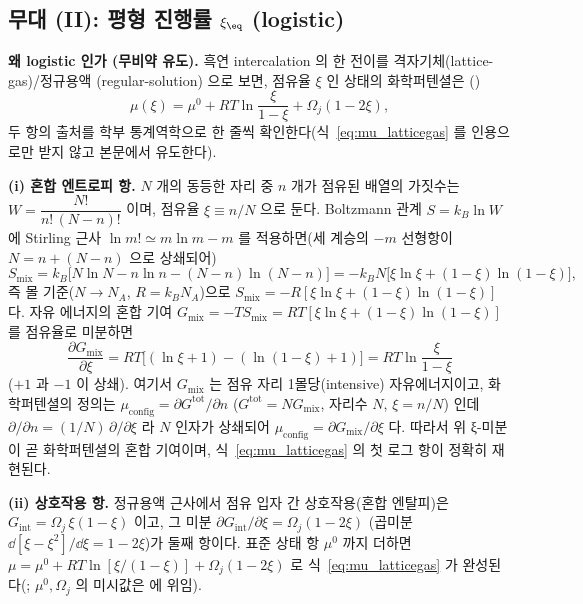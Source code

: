 \subsection{무대 (II): 평형 진행률 $\xi_\eq$ (logistic)}\label{sec:eq}
\textbf{왜 logistic 인가 (무비약 유도).} 흑연 intercalation 의 한 전이를 격자기체(lattice-gas)/정규용액
(regular-solution) 으로 보면, 점유율 $\xi$ 인 상태의 화학퍼텐셜은 \cite{mckinnon1983,bazant2013}()
\begin{equation}
\mu(\xi)=\mu^0+RT\ln\frac{\xi}{1-\xi}+\Omega_j(1-2\xi),
\label{eq:mu_latticegas}
\end{equation}
두 항의 출처를 학부 통계역학으로 한 줄씩 확인한다(식~\eqref{eq:mu_latticegas} 를 인용으로만 받지 않고 본문에서 유도한다).

\textbf{(i) 혼합 엔트로피 항.} $N$ 개의 동등한 자리 중 $n$ 개가 점유된 배열의 가짓수는
$W=\dfrac{N!}{n!\,(N-n)!}$ 이며, 점유율 $\xi\equiv n/N$ 으로 둔다. Boltzmann 관계 $S=k_B\ln W$ 에 Stirling
근사 $\ln m!\simeq m\ln m-m$ 를 적용하면(세 계승의 $-m$ 선형항이 $N=n+(N-n)$ 으로 상쇄되어)
\begin{equation}
S_{\mathrm{mix}}=k_B\big[N\ln N-n\ln n-(N-n)\ln(N-n)\big]
=-k_B N\big[\xi\ln\xi+(1-\xi)\ln(1-\xi)\big],
\label{eq:smix}
\end{equation}
즉 몰 기준($N\!\to\!N_A$, $R=k_B N_A$)으로 $S_{\mathrm{mix}}=-R[\xi\ln\xi+(1-\xi)\ln(1-\xi)]$ 다. 자유
에너지의 혼합 기여 $G_{\mathrm{mix}}=-TS_{\mathrm{mix}}=RT[\xi\ln\xi+(1-\xi)\ln(1-\xi)]$ 를 점유율로 미분하면
\begin{equation}
\frac{\partial G_{\mathrm{mix}}}{\partial\xi}=RT\big[(\ln\xi+1)-(\ln(1-\xi)+1)\big]=RT\ln\frac{\xi}{1-\xi}
\label{eq:mu_mix}
\end{equation}
($+1$ 과 $-1$ 이 상쇄). 여기서 $G_{\mathrm{mix}}$ 는 점유 자리 1몰당(intensive) 자유에너지이고, 화학퍼텐셜의 정의는
$\mu_{\mathrm{config}}=\partial G^{\mathrm{tot}}/\partial n$ ($G^{\mathrm{tot}}=N G_{\mathrm{mix}}$, 자리수 $N$, $\xi=n/N$)
인데 $\partial/\partial n=(1/N)\,\partial/\partial\xi$ 라 $N$ 인자가 상쇄되어 $\mu_{\mathrm{config}}=\partial G_{\mathrm{mix}}/\partial\xi$
다. 따라서 위 ξ-미분이 곧 화학퍼텐셜의 혼합 기여이며, 식~\eqref{eq:mu_latticegas} 의 첫 로그 항이 정확히 재현된다.

\textbf{(ii) 상호작용 항.} 정규용액 근사에서 점유 입자 간 상호작용(혼합 엔탈피)은
$G_{\mathrm{int}}=\Omega_j\,\xi(1-\xi)$ 이고, 그 미분 $\partial G_{\mathrm{int}}/\partial\xi
=\Omega_j(1-2\xi)$ (곱미분 $\dd[\xi-\xi^2]/\dd\xi=1-2\xi$)가 둘째 항이다. 표준 상태 항 $\mu^0$ 까지 더하면
$\mu=\mu^0+RT\ln[\xi/(1-\xi)]+\Omega_j(1-2\xi)$ 로 식~\eqref{eq:mu_latticegas} 가 완성된다(;
$\mu^0,\Omega_j$ 의 미시값은 \cite{mckinnon1983,bazant2013} 에 위임).


